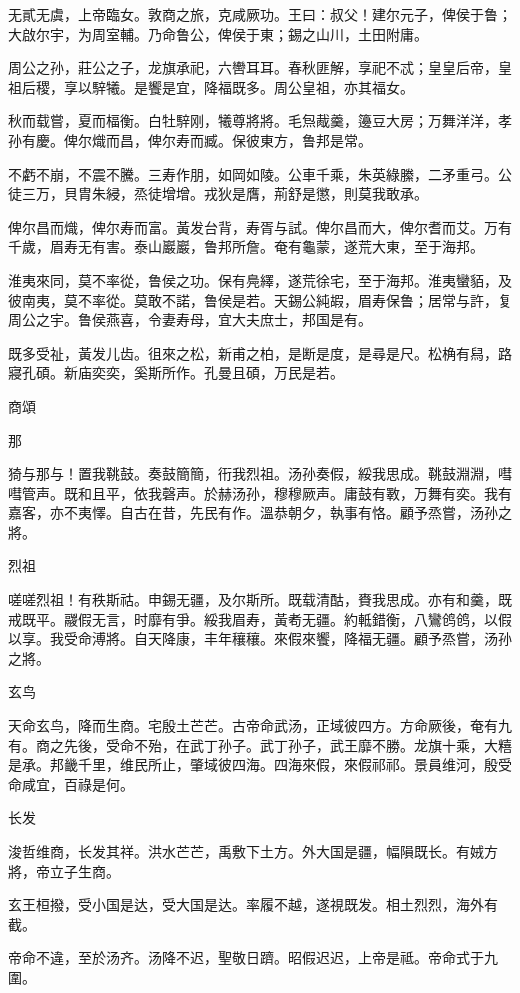无貳无虞，上帝臨女。敦商之旅，克咸厥功。王曰：叔父！建尔元子，俾侯于鲁；大啟尔宇，为周室輔。乃命鲁公，俾侯于東；錫之山川，土田附庸。

周公之孙，莊公之子，龙旗承祀，六轡耳耳。春秋匪解，享祀不忒；皇皇后帝，皇祖后稷，享以騂犧。是饗是宜，降福既多。周公皇祖，亦其福女。

秋而载嘗，夏而楅衡。白牡騂刚，犧尊將將。毛炰胾羹，籩豆大房；万舞洋洋，孝孙有慶。俾尔熾而昌，俾尔寿而臧。保彼東方，鲁邦是常。

不虧不崩，不震不騰。三寿作朋，如岡如陵。公車千乘，朱英綠縢，二矛重弓。公徒三万，貝胄朱綅，烝徒增增。戎狄是膺，荊舒是懲，則莫我敢承。

俾尔昌而熾，俾尔寿而富。黃发台背，寿胥与試。俾尔昌而大，俾尔耆而艾。万有千歲，眉寿无有害。泰山巖巖，鲁邦所詹。奄有龜蒙，遂荒大東，至于海邦。

淮夷來同，莫不率從，鲁侯之功。保有鳧繹，遂荒徐宅，至于海邦。淮夷蠻貊，及彼南夷，莫不率從。莫敢不諾，鲁侯是若。天錫公純嘏，眉寿保鲁；居常与許，复周公之宇。鲁侯燕喜，令妻寿母，宜大夫庶士，邦国是有。

既多受祉，黃发儿齿。徂來之松，新甫之柏，是断是度，是尋是尺。松桷有舄，路寢孔碩。新庙奕奕，奚斯所作。孔曼且碩，万民是若。




商頌


那

猗与那与！置我鞉鼓。奏鼓簡簡，衎我烈祖。汤孙奏假，綏我思成。鞉鼓淵淵，嘒嘒管声。既和且平，依我磬声。於赫汤孙，穆穆厥声。庸鼓有斁，万舞有奕。我有嘉客，亦不夷懌。自古在昔，先民有作。溫恭朝夕，執事有恪。顧予烝嘗，汤孙之將。

烈祖

嗟嗟烈祖！有秩斯祜。申錫无疆，及尔斯所。既载清酤，賚我思成。亦有和羹，既戒既平。鬷假无言，时靡有爭。綏我眉寿，黃耇无疆。約軧錯衡，八鸞鸧鸧，以假以享。我受命溥將。自天降康，丰年穰穰。來假來饗，降福无疆。顧予烝嘗，汤孙之將。

玄鸟

天命玄鸟，降而生商。宅殷土芒芒。古帝命武汤，正域彼四方。方命厥後，奄有九有。商之先後，受命不殆，在武丁孙子。武丁孙子，武王靡不勝。龙旗十乘，大糦是承。邦畿千里，维民所止，肇域彼四海。四海來假，來假祁祁。景員维河，殷受命咸宜，百祿是何。

长发

浚哲维商，长发其祥。洪水芒芒，禹敷下土方。外大国是疆，幅隕既长。有娀方將，帝立子生商。

玄王桓撥，受小国是达，受大国是达。率履不越，遂視既发。相土烈烈，海外有截。

帝命不違，至於汤齐。汤降不迟，聖敬日躋。昭假迟迟，上帝是祗。帝命式于九圍。

